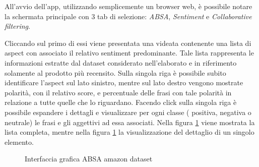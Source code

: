\documentclass[hidelinks, 12pt]{article}
\begin{document}
All'avvio dell'app, utilizzando semplicemente un browser web, è possibile notare la schermata principale con 3 tab di selezione: {\it ABSA}, {\it Sentiment} e {\it Collaborative filtering}.

Cliccando sul primo di essi viene presentata una videata contenente una lista di aspect con associato il relativo sentiment predominante. Tale lista rappresenta le informazioni estratte dal dataset considerato nell'elaborato e in riferimento solamente al prodotto più recensito. Sulla singola riga è possibile subito identificare l'aspect sul lato sinistro, mentre sul lato destro vengono mostrate polarità, con il relativo score, e percentuale delle frasi con tale polarità in relazione a tutte quelle che lo riguardano. Facendo click sulla singola riga è possibile espandere i dettagli e visualizzare per ogni classe ( positiva, negativa o neutrale) le frasi e gli aggettivi ad essa associati. Nella figura \ref{fig:aspect_ui_list}  viene mostrata la lista completa, mentre nella figura \ref{fig:aspect_ui_list}  la visualizzazione del dettaglio di un singolo elemento.

\begin{figure}[H]
	\centering
	\endminipage
	\hfill
	\endminipage
	\caption{Interfaccia grafica ABSA amazon dataset}
	\label{fig:aspect_ui_list}
\end{figure}
\end{document}
